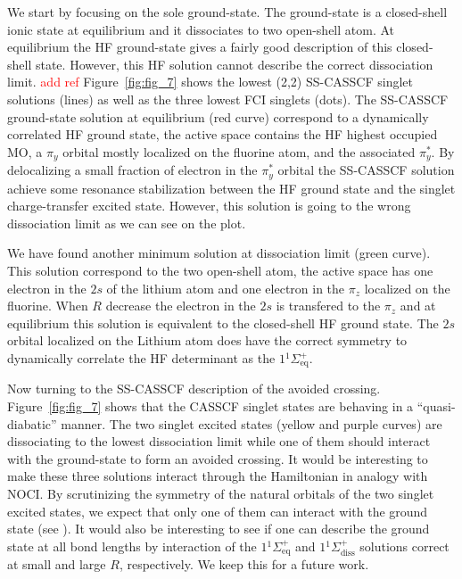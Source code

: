 \documentclass[aps,prb,reprint,showkeys,superscriptaddress]{revtex4-1}
\newcommand{\todo}[1]{\textcolor{red}{#1}}
\begin{document}
We start by focusing on the sole ground-state.
The ground-state is a closed-shell ionic state at equilibrium and it dissociates to two open-shell atom.
At equilibrium the HF ground-state gives a fairly good description of this closed-shell state.
However, this HF solution cannot describe the correct dissociation limit. \todo{add ref}
Figure~\ref{fig:fig_7} shows the lowest (2,2) SS-CASSCF singlet solutions (lines) as well as the three lowest FCI singlets (dots).
The SS-CASSCF ground-state solution at equilibrium (red curve) correspond to a dynamically correlated HF ground state, \ie the active space contains the HF highest occupied MO, a $\pi_y$ orbital mostly localized on the fluorine atom, and the associated $\pi_y^*$.
By delocalizing a small fraction of electron in the $\pi_y^*$ orbital the SS-CASSCF solution achieve some resonance stabilization between the HF ground state and the singlet charge-transfer excited state.
However, this solution is going to the wrong dissociation limit as we can see on the plot.

We have found another minimum solution at dissociation limit (green curve).
This solution correspond to the two open-shell atom, the active space has one electron in the $2s$ of the lithium atom and one electron in the $\pi_z$ localized on the fluorine.
When $R$ decrease the electron in the $2s$ is transfered to the $\pi_z$ and at equilibrium this solution is equivalent to the closed-shell HF ground state.
The $2s$ orbital localized on the Lithium atom does have the correct symmetry to dynamically correlate the HF determinant as the $1 {}^1\Sigma^+_{\text{eq}}$.

Now turning to the SS-CASSCF description of the avoided crossing.
Figure~\ref{fig:fig_7} shows that the CASSCF singlet states are behaving in a ``quasi-diabatic'' manner. The two singlet excited states (yellow and purple curves) are dissociating to the lowest dissociation limit while one of them should interact with the ground-state to form an avoided crossing.
It would be interesting to make these three solutions interact through the Hamiltonian in analogy with NOCI.
By scrutinizing the symmetry of the natural orbitals of the two singlet excited states, we expect that only one of them can interact with the ground state (see \SupInf).
It would also be interesting to see if one can describe the ground state at all bond lengths by interaction of the $1 {}^1\Sigma^+_{\text{eq}}$ and $1 {}^1\Sigma^+_{\text{diss}}$ solutions correct at small and large $R$, respectively.
We keep this for a future work.
\end{document}
